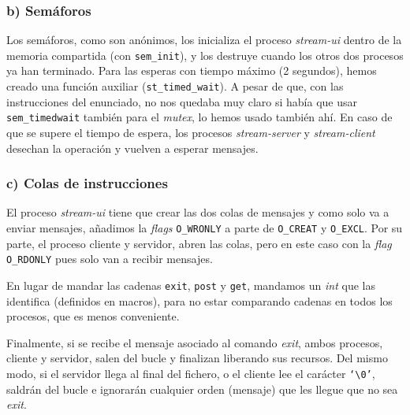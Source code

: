 \documentclass{article}
\begin{document}
\subsubsection*{b) Semáforos}
Los semáforos, como son anónimos, los inicializa el proceso \emph{stream-ui}
dentro de la memoria compartida (con \texttt{sem\_init}), y los destruye cuando los otros dos procesos ya han terminado. Para las esperas con tiempo máximo (2 segundos), hemos creado una función auxiliar (\texttt{st\_timed\_wait}). A pesar de que, con las instrucciones del enunciado, no nos quedaba muy claro si había que usar \texttt{sem\_timedwait} también para el \emph{mutex}, lo hemos usado también ahí. En caso de que se supere el tiempo de espera, los procesos \textit{stream-server} y \textit{stream-client} desechan la operación y vuelven a esperar mensajes.


\subsubsection*{c) Colas de instrucciones}

El proceso \textit{stream-ui} tiene que crear las dos colas de mensajes y como solo va a enviar mensajes, añadimos la \textit{flags} \texttt{O\_WRONLY} a parte de  \texttt{O\_CREAT} y  \texttt{O\_EXCL}. Por su parte, el proceso cliente y servidor, abren las colas, pero en este caso con la \textit{flag} \texttt{O\_RDONLY} pues solo van a recibir mensajes.   

En lugar de mandar las cadenas \texttt{exit}, \texttt{post} y \texttt{get}, 
mandamos un \emph{int} que las identifica (definidos en macros), para no estar comparando cadenas en todos los procesos, que es menos conveniente.

Finalmente, si se recibe el mensaje asociado al comando \textit{exit}, ambos procesos, cliente y servidor, salen del bucle y finalizan liberando sus recursos. Del mismo modo, si el servidor llega al final del fichero, o el cliente lee el carácter \texttt{`\textbackslash0'}, saldrán del bucle e ignorarán cualquier orden (mensaje) que les llegue que no sea \textit{exit}.
\end{document}
